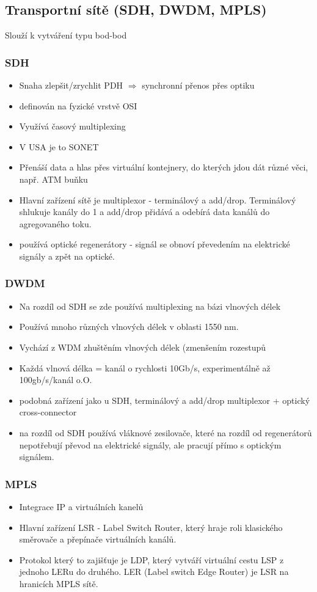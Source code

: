 \documentclass[10pt,a4paper]{article}
\begin{document}
\subsection{Transportní sítě (SDH, DWDM, MPLS)}
Slouží k vytváření typu bod-bod
\subsubsection{SDH}

\begin{itemize}
\item Snaha zlepšit/zrychlit PDH $\Rightarrow$ synchronní přenos přes optiku
\item definován na fyzické vrstvě OSI
\item Využívá časový multiplexing
\item V USA je to SONET
\item Přenáší data a hlas přes virtuální kontejnery, do kterých jdou dát různé věci, např. ATM buňku
\item Hlavní zařízení sítě je multiplexor - terminálový a add/drop. Terminálový shlukuje kanály do 1 a add/drop přidává a odebírá data kanálů do agregovaného toku.
\item používá optické regenerátory - signál se obnoví převedením na elektrické signály a zpět na optické.
\end{itemize}
\subsubsection{DWDM}
\begin{itemize}
\item Na rozdíl od SDH se zde používá multiplexing na bázi vlnových délek
\item Používá mnoho různých vlnových délek v oblasti 1550 nm.
\item Vychází z WDM zhuštěním vlnových délek (zmenšením rozestupů
\item Každá vlnová délka = kanál o rychlosti 10Gb/s, experimentálně až 100gb/s/kanál o.O.
\item podobná zařízení jako u SDH, terminálový a add/drop multiplexor + optický cross-connector
\item na rozdíl od SDH používá vláknové zesilovače, které na rozdíl od regenerátorů nepotřebují převod na elektrické signály, ale pracují přímo s optickým signálem.
\end{itemize}

\subsubsection{MPLS}
\begin{itemize}
\item Integrace IP a virtuálních kanelů
\item Hlavní zařízení LSR - Label Switch Router, který hraje roli klasického směrovače a přepínače virtuálních kanálů.
\item Protokol který to zajišťuje je LDP, který vytváří virtuální cestu LSP z jednoho LERu do druhého. LER (Label switch Edge Router) je LSR na hranicích MPLS sítě.
\end{itemize}
\end{document}
